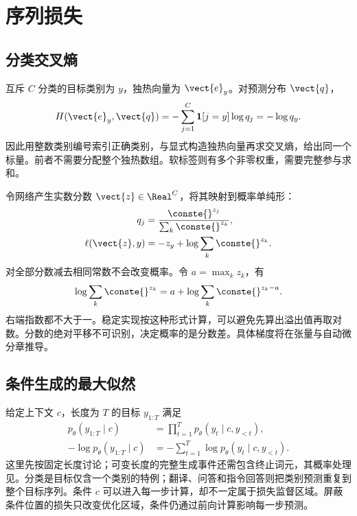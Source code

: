 \documentclass[../textbook.tex]{subfiles}
\begin{document}
\section{序列损失}

\subsection{分类交叉熵}
互斥 $C$ 分类的目标类别为 $y$，独热向量为 $\vect{e}_y$。对预测分布 $\vect{q}$，
\begin{equation}
 H(\vect{e}_y,\vect{q})=-\sum_{j=1}^C\mathbf1[j=y]\log q_j=-\log q_y.
\end{equation}
因此用整数类别编号索引正确类别，与显式构造独热向量再求交叉熵，给出同一个标量。前者不需要分配整个独热数组。软标签则有多个非零权重，需要完整参与求和。

令网络产生实数分数 $\vect{z}\in\Real^C$，将其映射到概率单纯形：
\begin{equation}
\begin{aligned}
 q_j &= \frac{\conste{}^{z_j}}{\sum_k\conste{}^{z_k}}, \\
 \ell(\vect{z},y) &= -z_y+\log\sum_k\conste{}^{z_k}.
\end{aligned}
\end{equation}
对全部分数减去相同常数不会改变概率。令 $a=\max_kz_k$，有
\begin{equation}
 \log\sum_k\conste{}^{z_k}=a+\log\sum_k\conste{}^{z_k-a}.
\end{equation}
右端指数都不大于一。稳定实现按这种形式计算，可以避免先算出溢出值再取对数。分数的绝对平移不可识别，决定概率的是分数差。具体梯度将在张量与自动微分章推导。

\subsection{条件生成的最大似然}
给定上下文 $c$，长度为 $T$ 的目标 $y_{1:T}$ 满足
\begin{equation}\label{eq:conditional-sequence-mle}
\begin{aligned}
 p_\theta(y_{1:T}\mid c) &= \prod_{t=1}^T p_\theta(y_t\mid c,y_{<t}), \\
 -\log p_\theta(y_{1:T}\mid c) &= -\sum_{t=1}^T\log p_\theta(y_t\mid c,y_{<t}).
\end{aligned}
\end{equation}
这里先按固定长度讨论；可变长度的完整生成事件还需包含终止词元，其概率处理见。分类是目标仅含一个类别的特例；翻译、问答和指令回答则把类别预测重复到整个目标序列。条件 $c$ 可以进入每一步计算，却不一定属于损失监督区域。屏蔽条件位置的损失只改变优化区域，条件仍通过前向计算影响每一步预测。
\end{document}
